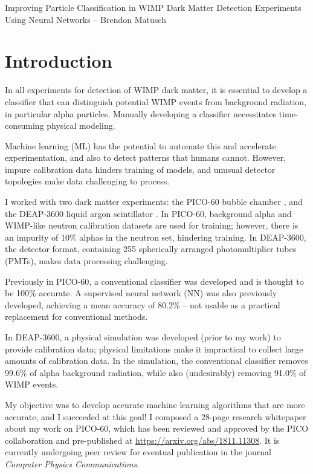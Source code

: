 \documentclass[12pt]{article}
\begin{document}
\begin{center}
    \begin{large}
        Improving Particle Classification in WIMP Dark Matter Detection Experiments Using Neural Networks -- Brendon Matusch
    \end{large}
\end{center}

\section{Introduction}

In all experiments for detection of WIMP dark matter, it is essential to develop a classifier that can distinguish potential WIMP events from background radiation, in particular alpha particles. Manually developing a classifier necessitates time-consuming physical modeling.

Machine learning (ML) has the potential to automate this and accelerate experimentation, and also to detect patterns that humans cannot. However, impure calibration data hinders training of models, and unusual detector topologies make data challenging to process.

I worked with two dark matter experiments: the PICO-60 bubble chamber \cite{pico}, and the DEAP-3600 liquid argon scintillator \cite{deap}. In PICO-60, background alpha and WIMP-like neutron calibration datasets are used for training; however, there is an impurity of 10\% alphas in the neutron set, hindering training. In DEAP-3600, the detector format, containing 255 spherically arranged photomultiplier tubes (PMTs), makes data processing challenging.

Previously in PICO-60, a conventional classifier was developed and is thought to be 100\% accurate. A supervised neural network (NN) was also previously developed, achieving a mean accuracy of 80.2\% -- not usable as a practical replacement for conventional methods.

In DEAP-3600, a physical simulation was developed (prior to my work) to provide calibration data; physical limitations make it impractical to collect large amounts of calibration data. In the simulation, the conventional classifier removes 99.6\% of alpha background radiation, while also (undesirably) removing 91.0\% of WIMP events.

My objective was to develop accurate machine learning algorithms that are more accurate, and I succeeded at this goal! I composed a 28-page research whitepaper \cite{me} about my work on PICO-60, which has been reviewed and approved by the PICO collaboration and pre-published at \url{https://arxiv.org/abs/1811.11308}. It is currently undergoing peer review for eventual publication in the journal \textit{Computer Physics Communications}.
\end{document}
